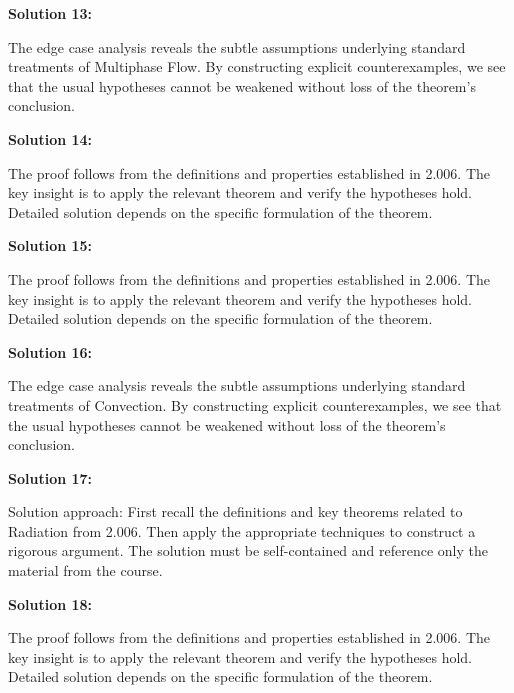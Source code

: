 \documentclass[12pt,a4paper]{exam}
\begin{document}
\vspace{0.5cm}

\textbf{Solution 13:}

The edge case analysis reveals the subtle assumptions underlying standard treatments of Multiphase Flow. By constructing explicit counterexamples, we see that the usual hypotheses cannot be weakened without loss of the theorem's conclusion.

\vspace{0.5cm}

\textbf{Solution 14:}

The proof follows from the definitions and properties established in 2.006. The key insight is to apply the relevant theorem and verify the hypotheses hold. Detailed solution depends on the specific formulation of the theorem.

\vspace{0.5cm}

\textbf{Solution 15:}

The proof follows from the definitions and properties established in 2.006. The key insight is to apply the relevant theorem and verify the hypotheses hold. Detailed solution depends on the specific formulation of the theorem.

\vspace{0.5cm}

\textbf{Solution 16:}

The edge case analysis reveals the subtle assumptions underlying standard treatments of Convection. By constructing explicit counterexamples, we see that the usual hypotheses cannot be weakened without loss of the theorem's conclusion.

\vspace{0.5cm}

\textbf{Solution 17:}

Solution approach: First recall the definitions and key theorems related to Radiation from 2.006. Then apply the appropriate techniques to construct a rigorous argument. The solution must be self-contained and reference only the material from the course.

\vspace{0.5cm}

\textbf{Solution 18:}

The proof follows from the definitions and properties established in 2.006. The key insight is to apply the relevant theorem and verify the hypotheses hold. Detailed solution depends on the specific formulation of the theorem.
\end{document}
